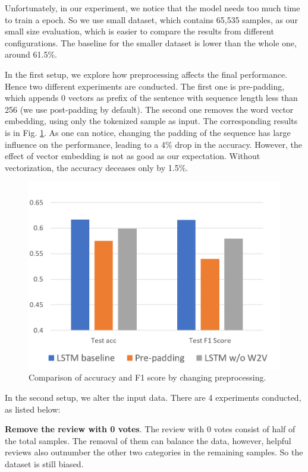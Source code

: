 \documentclass[11pt]{article}
\begin{document}
Unfortunately, in our experiment, we notice that the model needs too much time to train a epoch. So we use small dataset, which contains 65,535 samples, as our small size evaluation, which is easier to compare the results from different configurations. The baseline for the smaller dataset is lower than the whole one, around 61.5\%. 

In the first setup, we explore how preprocessing affects the final performance. Hence two different experiments are conducted. The first one is pre-padding, which appends 0 vectors as prefix of the sentence with sequence length less than 256 (we use post-padding by default). The second one removes the word vector embedding, using only the tokenized sample as input. The corresponding results is in Fig. \ref{result_acc_f1_comp_pp}. As one can notice, changing the padding of the sequence has large influence on the performance,  leading to a 4\% drop in the accuracy. However, the effect of vector embedding is not as good as our expectation. Without vectorization, the accuracy deceases only by 1.5\%. 

\begin{figure}[tbp]
    \centering
    \includegraphics[width=0.9\linewidth]{./figures/acc_f1_comp_pp.png}
    \caption{Comparison of accuracy and F1 score by changing preprocessing.}
    \label{result_acc_f1_comp_pp}
\end{figure}

In the second setup, we alter the input data. There are 4 experiments conducted, as listed below:

\textbf{Remove the review with 0 votes}. The review with 0 votes consist of half of the total samples. The removal of them can balance the data, however, helpful reviews also outnumber the other two categories in the remaining samples. So the dataset is still biased.
\end{document}
